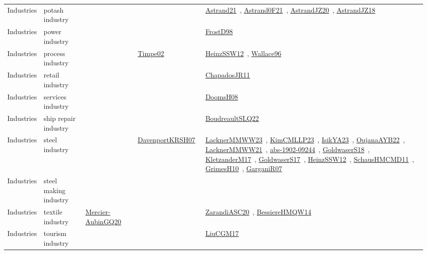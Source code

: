 {\begin{longtable}{lp{3cm}>{\raggedright\arraybackslash}p{6cm}>{\raggedright\arraybackslash}p{6cm}>{\raggedright\arraybackslash}p{8cm}}
Industries & potash industry &  &  & \href{works/Astrand21.pdf}{Astrand21}~\cite{Astrand21}, \href{works/Astrand0F21.pdf}{Astrand0F21}~\cite{Astrand0F21}, \href{works/AstrandJZ20.pdf}{AstrandJZ20}~\cite{AstrandJZ20}, \href{works/AstrandJZ18.pdf}{AstrandJZ18}~\cite{AstrandJZ18}\\
Industries & power industry &  &  & \href{works/FrostD98.pdf}{FrostD98}~\cite{FrostD98}\\
Industries & process industry &  & \href{works/Timpe02.pdf}{Timpe02}~\cite{Timpe02} & \href{works/HeinzSSW12.pdf}{HeinzSSW12}~\cite{HeinzSSW12}, \href{works/Wallace96.pdf}{Wallace96}~\cite{Wallace96}\\
Industries & retail industry &  &  & \href{works/ChapadosJR11.pdf}{ChapadosJR11}~\cite{ChapadosJR11}\\
Industries & services industry &  &  & \href{works/DoomsH08.pdf}{DoomsH08}~\cite{DoomsH08}\\
Industries & ship repair industry &  &  & \href{works/BoudreaultSLQ22.pdf}{BoudreaultSLQ22}~\cite{BoudreaultSLQ22}\\
Industries & steel industry &  & \href{works/DavenportKRSH07.pdf}{DavenportKRSH07}~\cite{DavenportKRSH07} & \href{works/LacknerMMWW23.pdf}{LacknerMMWW23}~\cite{LacknerMMWW23}, \href{works/KimCMLLP23.pdf}{KimCMLLP23}~\cite{KimCMLLP23}, \href{works/IsikYA23.pdf}{IsikYA23}~\cite{IsikYA23}, \href{works/OujanaAYB22.pdf}{OujanaAYB22}~\cite{OujanaAYB22}, \href{works/LacknerMMWW21.pdf}{LacknerMMWW21}~\cite{LacknerMMWW21}, \href{works/abs-1902-09244.pdf}{abs-1902-09244}~\cite{abs-1902-09244}, \href{works/GoldwaserS18.pdf}{GoldwaserS18}~\cite{GoldwaserS18}, \href{works/KletzanderM17.pdf}{KletzanderM17}~\cite{KletzanderM17}, \href{works/GoldwaserS17.pdf}{GoldwaserS17}~\cite{GoldwaserS17}, \href{works/HeinzSSW12.pdf}{HeinzSSW12}~\cite{HeinzSSW12}, \href{works/SchausHMCMD11.pdf}{SchausHMCMD11}~\cite{SchausHMCMD11}, \href{works/GrimesH10.pdf}{GrimesH10}~\cite{GrimesH10}, \href{works/GarganiR07.pdf}{GarganiR07}~\cite{GarganiR07}\\
Industries & steel making industry &  &  & \\
Industries & textile industry & \href{works/Mercier-AubinGQ20.pdf}{Mercier-AubinGQ20}~\cite{Mercier-AubinGQ20} &  & \href{works/ZarandiASC20.pdf}{ZarandiASC20}~\cite{ZarandiASC20}, \href{works/BessiereHMQW14.pdf}{BessiereHMQW14}~\cite{BessiereHMQW14}\\
Industries & tourism industry &  &  & \href{works/LiuCGM17.pdf}{LiuCGM17}~\cite{LiuCGM17}\\
\end{longtable}
}

